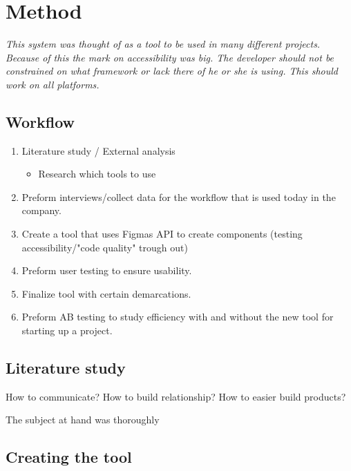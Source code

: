 \section{Method}

\textit{
This system was thought of as a tool to be used in many different projects. Because of this the mark on accessibility was big. The developer should not be constrained on what framework or lack there of he or she is using. This should work on all platforms.
}


\subsection{Workflow}%
\label{sub:workflow}

\begin{enumerate}
  \item Literature study / External analysis
    \begin{itemize}
      \item Research which tools to use
    \end{itemize}
  \item Preform interviews/collect data for the workflow that is used today in the company.
  \item Create a tool that uses Figmas API to create components (testing accessibility/"code quality" trough out)
  \item Preform user testing to ensure usability. 
  \item Finalize tool with certain demarcations.
  \item Preform AB testing to study efficiency with and without the new tool for starting up a project.
\end{enumerate}

\subsection{Literature study}%
\label{sub:Literature study}
How to communicate? 
How to build relationship? 
How to easier build products?

The subject at hand was thoroughly 


\subsection{Creating the tool}%
\label{sub:}


